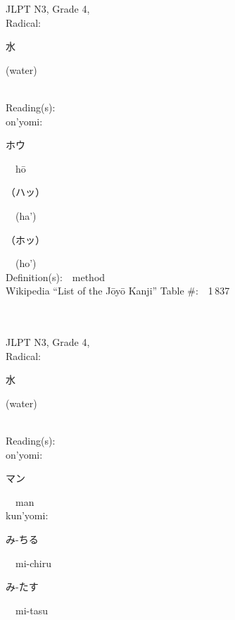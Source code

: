 \begin{multicols}{2}
{JLPT N3, Grade 4, \\Radical:\ \ {\begin{CJK}{UTF8}{min} 水 \end{CJK}} (water) } \\
Reading(s):\ \ \\
{\hspace*{1em}}on'yomi:\ \ \\
{\hspace*{2em}}{\begin{CJK}{UTF8}{min} ホウ \end{CJK}}\ \ h\=o\ \ \\
{\hspace*{2em}}{\begin{CJK}{UTF8}{min} （ハッ） \end{CJK}}\ \ (ha')\ \ \\
{\hspace*{2em}}{\begin{CJK}{UTF8}{min} （ホッ） \end{CJK}}\ \ (ho')\ \ \\
Definition(s):\ \ method \\
Wikipedia ``List of the J\=oy\=o Kanji'' Table \#:\ \ 1\,837 \\
\ \ \\
{\fontsize{34pt}{40pt}  }\ \ \\  %
{JLPT N3, Grade 4, \\Radical:\ \ {\begin{CJK}{UTF8}{min} 水 \end{CJK}} (water) } \\
Reading(s):\ \ \\
{\hspace*{1em}}on'yomi:\ \ \\
{\hspace*{2em}}{\begin{CJK}{UTF8}{min} マン \end{CJK}}\ \ man\ \ \\
{\hspace*{1em}}kun'yomi:\ \ \\
{\hspace*{2em}}{\begin{CJK}{UTF8}{min} み-ちる \end{CJK}}\ \ mi-chiru\ \ \\
{\hspace*{2em}}{\begin{CJK}{UTF8}{min} み-たす \end{CJK}}\ \ mi-tasu\ \ \\

\end{multicols}
